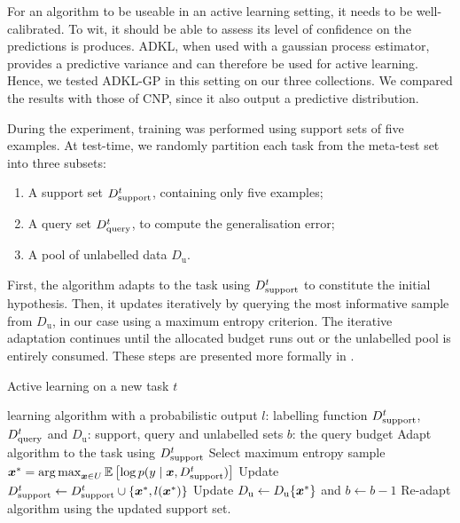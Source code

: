 \documentclass[11pt]{article}
\numberwithin{equation}{subsection}
\begin{document}
For an algorithm to be useable in an active learning setting, it needs to be well-calibrated. To wit, it should be able to assess its level of confidence on the predictions is produces. ADKL, when used with a gaussian process estimator, provides a predictive variance and can therefore be used for active learning. Hence, we tested ADKL-GP in this setting on our three collections. We compared the results with those of CNP, since it also output a predictive distribution.

During the experiment, training was performed using support sets of five examples. At test-time, we randomly partition each task from the meta-test set into three subsets:
\begin{enumerate}[itemsep=1pt,label=\alph*)]
  \item A support set ${D_{\mathrm{support}}^t}$, containing only five examples;
  \item A query set ${D_{\mathrm{query}}^t}$, to compute the generalisation error;
  \item A pool of unlabelled data $D_\mathrm{u}$.
\end{enumerate}

First, the algorithm adapts to the task using ${D_{\mathrm{support}}^t}$ to constitute the initial hypothesis. Then, it updates iteratively by querying the most informative sample from $D_\mathrm{u}$, in our case using a maximum entropy criterion. The iterative adaptation continues until the allocated budget runs out or the unlabelled pool is entirely consumed. These steps are presented more formally in .

\begin{algorithm}[ht]
  \caption{Active learning on a new task $t$}
  \label{algo:active}
  \begin{algorithmic}[1]
    \REQUIRE learning algorithm with a probabilistic output
    \REQUIRE $l$: labelling function
    \REQUIRE ${D_{\mathrm{support}}^t}$, ${D_{\mathrm{query}}^t}$ and $D_\mathrm{u}$: support, query and unlabelled sets
    \REQUIRE $b$: the query budget
    \STATE Adapt algorithm to the task using ${D_{\mathrm{support}}^t}$
      \STATE Select maximum entropy sample ${\bm{x}}^* = \operatorname*{arg\,max}_{{\bm{x}} \in U}{\mathbb{E} \left[ \log p(y \mid {\bm{x}}, {D_{\mathrm{support}}^t}) \right]}$
      \STATE Update ${D_{\mathrm{support}}^t} \gets {D_{\mathrm{support}}^t} \cup \{{\bm{x}}^*, l({\bm{x}}^*)\}$
      \STATE Update $D_\mathrm{u} \gets D_\mathrm{u} \{{\bm{x}}^*\}$ and $b \gets b-1$
      \STATE Re-adapt algorithm using the updated support set.
    \ENDWHILE
  \end{algorithmic}
\end{algorithm}
\end{document}
